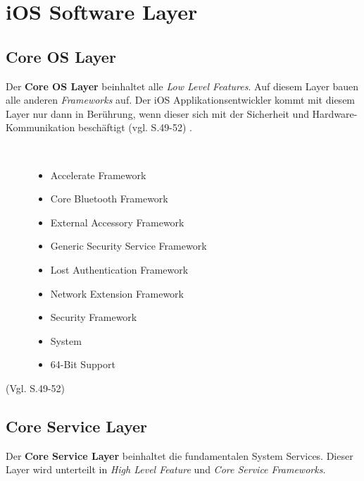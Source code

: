 \section{iOS Software Layer}
\label{sec:iOSSWLayer}
\subsection{Core OS Layer}
\label{sec:CoreLayer}
Der \textbf{Core OS Layer} beinhaltet alle \textit{\glqq Low Level Features\grqq}. Auf diesem Layer bauen alle anderen \textit{\glqq Frameworks\grqq{}} auf. Der iOS Applikationsentwickler kommt mit diesem Layer nur dann in Berührung, wenn dieser sich mit der Sicherheit und Hardware-Kommunikation beschäftigt (vgl. \cite{Apple[6]} S.49-52) . 
\begin{description}
	\item[\parbox{\textwidth} {Das Core OS Layer Framework beinhaltet folgende Frameworks}]~\par
	\begin{itemize}
		\item Accelerate Framework
		\item Core Bluetooth Framework
		\item External Accessory Framework
		\item Generic Security Service Framework
		\item Lost Authentication Framework
		\item Network Extension Framework
		\item Security Framework
		\item System
		\item 64-Bit Support
	\end{itemize}
\end{description}
 (Vgl. \cite{Apple[6]} S.49-52) 
 
\subsection{Core Service Layer}
\label{sec:CoreServiceLayer}		
Der \textbf{Core Service Layer} beinhaltet die fundamentalen System Services. Dieser Layer wird unterteilt in \textit{\glqq High Level Feature\grqq{}} und \textit{\glqq Core Service Frameworks\grqq{}}.

